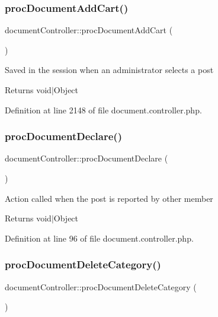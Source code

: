 \subsubsection{\texorpdfstring{proc\+Document\+Add\+Cart()}{procDocumentAddCart()}}
{\footnotesize\ttfamily document\+Controller\+::proc\+Document\+Add\+Cart (\begin{DoxyParamCaption}{ }\end{DoxyParamCaption})}

Saved in the session when an administrator selects a post \begin{DoxyReturn}{Returns}
void$\vert$\+Object 
\end{DoxyReturn}


Definition at line 2148 of file document.\+controller.\+php.

\hypertarget{classdocumentController_a9c23f01e72bf1028d72f43ebf08d0cee}{}\label{classdocumentController_a9c23f01e72bf1028d72f43ebf08d0cee} 
\subsubsection{\texorpdfstring{proc\+Document\+Declare()}{procDocumentDeclare()}}
{\footnotesize\ttfamily document\+Controller\+::proc\+Document\+Declare (\begin{DoxyParamCaption}{ }\end{DoxyParamCaption})}

Action called when the post is reported by other member \begin{DoxyReturn}{Returns}
void$\vert$\+Object 
\end{DoxyReturn}


Definition at line 96 of file document.\+controller.\+php.

\hypertarget{classdocumentController_a60d6012f96c71ee539d4152bc2c6f994}{}\label{classdocumentController_a60d6012f96c71ee539d4152bc2c6f994} 
\subsubsection{\texorpdfstring{proc\+Document\+Delete\+Category()}{procDocumentDeleteCategory()}}
{\footnotesize\ttfamily document\+Controller\+::proc\+Document\+Delete\+Category (\begin{DoxyParamCaption}{ }\end{DoxyParamCaption})}


